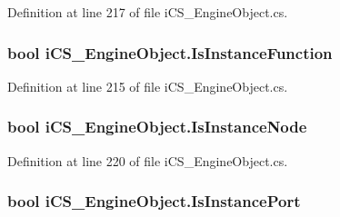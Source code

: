 Definition at line 217 of file i\+C\+S\+\_\+\+Engine\+Object.\+cs.

\hypertarget{classi_c_s___engine_object_abeefa6c463c87ee35ac3b960e04650b4}{
\subsubsection[{Is\+Instance\+Function}]{\setlength{\rightskip}{0pt plus 5cm}bool i\+C\+S\+\_\+\+Engine\+Object.\+Is\+Instance\+Function\hspace{0.3cm}{\ttfamily [get]}}}\label{classi_c_s___engine_object_abeefa6c463c87ee35ac3b960e04650b4}


Definition at line 215 of file i\+C\+S\+\_\+\+Engine\+Object.\+cs.

\hypertarget{classi_c_s___engine_object_a760a24107880933fbce14d189c732721}{
\subsubsection[{Is\+Instance\+Node}]{\setlength{\rightskip}{0pt plus 5cm}bool i\+C\+S\+\_\+\+Engine\+Object.\+Is\+Instance\+Node\hspace{0.3cm}{\ttfamily [get]}}}\label{classi_c_s___engine_object_a760a24107880933fbce14d189c732721}


Definition at line 220 of file i\+C\+S\+\_\+\+Engine\+Object.\+cs.

\hypertarget{classi_c_s___engine_object_a4382781cca96d10410c5adcd06952a4c}{
\subsubsection[{Is\+Instance\+Port}]{\setlength{\rightskip}{0pt plus 5cm}bool i\+C\+S\+\_\+\+Engine\+Object.\+Is\+Instance\+Port\hspace{0.3cm}{\ttfamily [get]}}}\label{classi_c_s___engine_object_a4382781cca96d10410c5adcd06952a4c}


